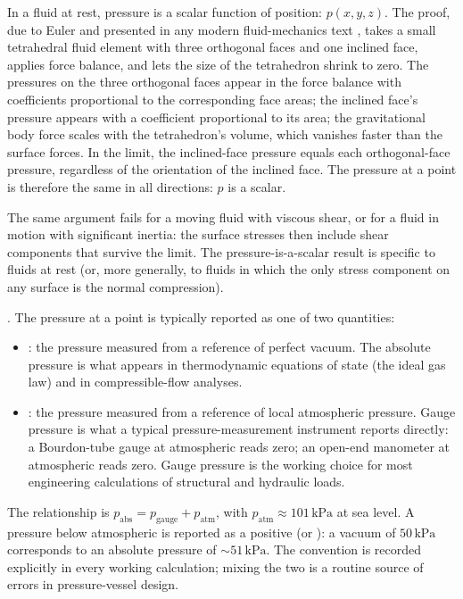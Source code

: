 In a fluid at rest, pressure is a scalar function of position:
$p(x, y, z)$. The proof, due to Euler and presented in any modern
fluid-mechanics text \cite[ch.~2]{text:white-fluid-mechanics},
takes a small tetrahedral fluid element with three orthogonal
faces and one inclined face, applies force balance, and lets the
size of the tetrahedron shrink to zero. The pressures on the
three orthogonal faces appear in the force balance with
coefficients proportional to the corresponding face areas; the
inclined face's pressure appears with a coefficient proportional
to its area; the gravitational body force scales with the
tetrahedron's volume, which vanishes faster than the surface
forces. In the limit, the inclined-face pressure equals each
orthogonal-face pressure, regardless of the orientation of the
inclined face. The pressure at a point is therefore the same in
all directions: $p$ is a scalar.

The same argument fails for a moving fluid with viscous shear, or
for a fluid in motion with significant inertia: the surface
stresses then include shear components that survive the
limit. The pressure-is-a-scalar result is specific to fluids at
rest (or, more generally, to fluids in which the only stress
component on any surface is the normal compression).

. The pressure at a point is
typically reported as one of two quantities:

\begin{itemize}[leftmargin=*]
  \item {}: the pressure measured from a
    reference of perfect vacuum. The absolute pressure is what
    appears in thermodynamic equations of state (the ideal gas
    law) and in compressible-flow analyses.
  \item {}: the pressure measured from a
    reference of local atmospheric pressure. Gauge pressure is
    what a typical pressure-measurement instrument reports
    directly: a Bourdon-tube gauge at atmospheric reads zero;
    an open-end manometer at atmospheric reads zero. Gauge
    pressure is the working choice for most engineering
    calculations of structural and hydraulic loads.
\end{itemize}

The relationship is $p_{\text{abs}} = p_{\text{gauge}} + p_{
\text{atm}}$, with $p_{\text{atm}} \approx 101\,\text{kPa}$ at
sea level. A pressure below atmospheric is reported as a positive
 (or ): a
vacuum of $50\,\text{kPa}$ corresponds to an absolute pressure
of $\sim 51\,\text{kPa}$. The convention is recorded explicitly
in every working calculation; mixing the two is a routine source
of errors in pressure-vessel design.

